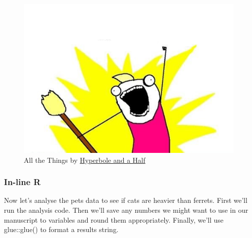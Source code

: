 \documentclass[
  oneside]{book}
\begin{document}
\begin{figure}
\centering
\includegraphics{images/memes/x-all-the-things.png}
\caption{All the Things by \href{http://hyperboleandahalf.blogspot.com/}{Hyperbole and a Half}}
\end{figure}

\hypertarget{in-line-r}{%
\subsubsection{In-line R}\label{in-line-r}}

Now let's analyse the pets data to see if cats are heavier than ferrets. First we'll run the analysis code. Then we'll save any numbers we might want to use in our manuscript to variables and round them appropriately. Finally, we'll use {glue}{::}{glue}{(}{)} to format a results string.
\end{document}
